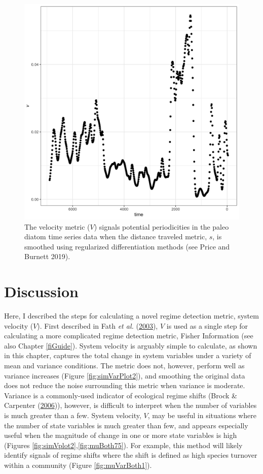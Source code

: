 \documentclass[print]{nuthesis}
\begin{document}
\begin{figure}
\includegraphics[width=0.85\linewidth]{./chapterFiles/velocity/figsCalledInDiss/paleoV} \caption{The velocity metric  ($V$) signals potential periodicities in the paleo diatom time series data when the distance traveled metric, $s$, is smoothed using regularized differentiation methods (see Price and Burnett 2019).}\label{fig:paleoV}
\end{figure}
\hypertarget{discussion-3}{%
\section{Discussion}\label{discussion-3}}

Here, I described the steps for calculating a novel regime detection metric, system velocity (\(V\)). First described in Fath \emph{et al.} (\protect\hyperlink{ref-fath_regime_2003}{2003}), \(V\) is used as a single step for calculating a more complicated regime detection metric, Fisher Information (see also Chapter \ref{fiGuide}). System velocity is arguably simple to calculate, as shown in this chapter, captures the total change in system variables under a variety of mean and variance conditions. The metric does not, however, perform well as variance increases (Figure \ref{fig:simVarPlot2}), and smoothing the original data does not reduce the noise surrounding this metric when variance is moderate. Variance is a commonly-used indicator of ecological regime shifts (Brock \& Carpenter (\protect\hyperlink{ref-brock_variance_2006}{2006})), however, is difficult to interpret when the number of variables is much greater than a few. System velocity, \(V\), may be useful in situations where the number of state variables is much greater than few, and appears especially useful when the magnitude of change in one or more state variables is high (Figures \ref{fig:simVplot2},\ref{fig:muBoth75}). For example, this method will likely identify signals of regime shifts where the shift is defined as high species turnover within a community (Figure \ref{fig:muVarBoth1}).
\end{document}
